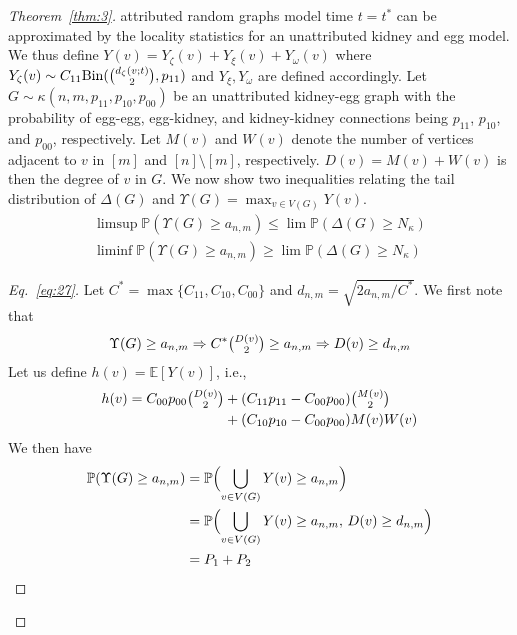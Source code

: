 \documentclass[draftcls]{IEEEtran}
\theoremstyle{definition}
\begin{document}
\begin{proof}[Theorem~\ref{thm:3}]
attributed random graphs model time $t = t^{*}$ can be approximated by
the locality statistics for an unattributed kidney and egg model. We
thus define $Y(v) = Y_{\zeta}(v) + Y_{\xi}(v) + Y_{\omega}(v)$
where $Y_{\zeta}(v) \sim C_{11}
\mathrm{Bin}(\tbinom{d_{\zeta}(v;t)}{2}, p_{11})$ and $Y_{\xi},
Y_{\omega}$ are defined accordingly. Let $G \sim \kappa(n,m,p_{11},
p_{10}, p_{00})$ be an unattributed kidney-egg graph with the
probability of egg-egg, egg-kidney, and kidney-kidney connections
being $p_{11}$, $p_{10}$, and $p_{00}$, respectively. Let $M(v)$ and
$W(v)$ denote the number of vertices adjacent to $v$ in $[m]$ and $[n]
\setminus [m]$, respectively. $D(v) = M(v) + W(v)$ is then the degree
of $v$ in $G$. We now show two
inequalities relating the tail distribution of 
$\Delta(G)$ and $\Upsilon(G) = \max_{v \in V(G)} Y(v)$.
\begin{gather}
  \label{eq:27}
    \limsup \mathbb{P}( \Upsilon(G) \geq a_{n,m} ) \leq \lim
   \mathbb{P}( \Delta(G) \geq N_\kappa) \\
   \label{eq:30}
  \liminf \mathbb{P}( \Upsilon(G) \geq a_{n,m} ) \geq \lim \mathbb{P}(
  \Delta(G) \geq N_{\kappa})
\end{gather}
\begin{proof}[Eq.~\eqref{eq:27}]
 Let $C^{*} = \max\{C_{11},
C_{10}, C_{00}\}$ and $d_{n,m} = \sqrt{2 a_{n,m}/C^{*}}$. We first
note that
\begin{equation*}
\Upsilon(G) \geq a_{n,m} \Rightarrow C^{*} \tbinom{D(v)}{2} \geq
a_{n,m} \Rightarrow D(v) \geq d_{n,m} 
\end{equation*}
Let us define $h(v) = \mathbb{E}[Y(v)]$, i.e., 
\begin{equation*}
  \begin{split}
  h(v) = C_{00}p_{00} \tbinom{D(v)}{2} &+ (C_{11} p_{11} - C_{00}
  p_{00}) \tbinom{M(v)}{2} \\ &+ (C_{10} p_{10} - C_{00} p_{00}) M(v) W(v)
  \end{split}
\end{equation*}
We then have
  \begin{equation*}
    \label{eq:31}
    \begin{split}
    \mathbb{P}(\Upsilon(G) \geq a_{n,m}) &= \mathbb{P}\Bigl( \bigcup_{v
      \in V(G)} Y(v) \geq a_{n,m}\Bigr) \\
    &= \mathbb{P}\Bigl( \bigcup_{v
      \in V(G)} Y(v) \geq a_{n,m}, \, D(v) \geq d_{n,m} \Bigr) \\
    &= P_1 + P_2
    \end{split}
  \end{equation*}

\end{proof}
\end{proof}
\end{document}
